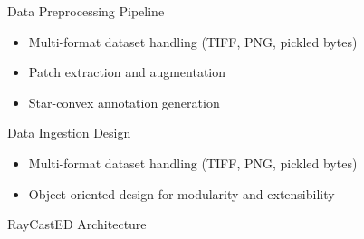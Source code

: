 \documentclass[aspectratio=169, 10pt]{beamer}
\begin{document}
\begin{frame}{Data Preprocessing Pipeline}
  \begin{center}
    \resizebox{0.95\textwidth}{!}{}
  \end{center}
 
  \begin{itemize}
    \item Multi-format dataset handling (TIFF, PNG, pickled bytes)
    \item Patch extraction and augmentation
    \item Star-convex annotation generation
  \end{itemize}
\end{frame}

\begin{frame}{Data Ingestion Design}
  \begin{center}
    \resizebox{0.75\textwidth}{!}{}
  \end{center}
 
  \begin{itemize}
    \item Multi-format dataset handling (TIFF, PNG, pickled bytes)
    \item Object-oriented design for modularity and extensibility
  \end{itemize}
\end{frame}


\begin{frame}{RayCastED Architecture}
  \begin{center}
    \resizebox{0.6\textwidth}{!}{}
  \end{center}

\end{frame}
\end{document}
